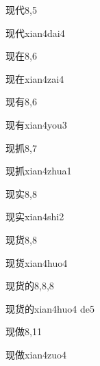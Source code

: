 \begin{entry}{现代}{8,5}
  \begin{phonetics}{现代}{xian4dai4}
  \end{phonetics}
\end{entry}

\begin{entry}{现在}{8,6}
  \begin{phonetics}{现在}{xian4zai4}
  \end{phonetics}
\end{entry}

\begin{entry}{现有}{8,6}
  \begin{phonetics}{现有}{xian4you3}
  \end{phonetics}
\end{entry}

\begin{entry}{现抓}{8,7}
  \begin{phonetics}{现抓}{xian4zhua1}
  \end{phonetics}
\end{entry}

\begin{entry}{现实}{8,8}
  \begin{phonetics}{现实}{xian4shi2}
  \end{phonetics}
\end{entry}

\begin{entry}{现货}{8,8}
  \begin{phonetics}{现货}{xian4huo4}
  \end{phonetics}
\end{entry}

\begin{entry}{现货的}{8,8,8}
  \begin{phonetics}{现货的}{xian4huo4 de5}
  \end{phonetics}
\end{entry}

\begin{entry}{现做}{8,11}
  \begin{phonetics}{现做}{xian4zuo4}
  \end{phonetics}
\end{entry}

